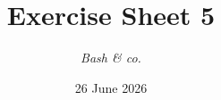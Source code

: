 




\title{{\vspace{-12mm}\huge\textbf{Exercise Sheet 5}}}
\author{\textit{Bash \& co.}}
\date{{\small 26 June 2026}}


    \maketitle
    \bigskip
    
    \bigskip
    
    \bigskip
    
